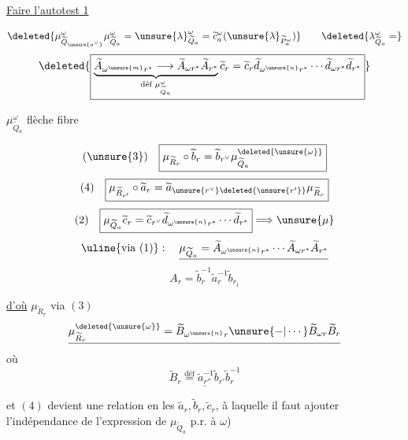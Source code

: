 \uline{Faire l'autotest 1}

\[
\deleted{\mu_{\widetilde Q_{\unsure{a^\vee}}}^{\omega}\mu_{\widetilde Q_a}^{\omega}
=\unsure{\lambda}_{\widetilde Q_a}^{\omega}
=\widetilde c_a^\omega(\unsure{\lambda}_{\widetilde P_a^\omega})}
\qquad
\deleted{\lambda_{\widetilde Q_a}^{\omega}=}
\]
\[
\deleted{\boxed{
\underbrace{\widetilde A_{\omega^{\unsure{m}}r^*}\longrightarrow
\widetilde A_{\omega r^*}\widetilde A_{r^*}}_{\text{déf }\mu_{\widetilde Q_a}^{\omega}}
\widetilde c_r=\widetilde c_r\widetilde d_{\omega^{\unsure{n}}r^*}\cdots
\widetilde d_{\omega r^*}\widetilde d_{r^*}}}
\]

$\mu_{\widetilde Q_a}^{\omega}$ flèche fibre

\[
(\unsure{3})\quad\boxed{\mu_{\widetilde R_r}\circ\widetilde b_r
=\widetilde b_{r^\vee}\mu_{\widetilde Q_a}^{\deleted{\unsure{\omega}}}}
\]
\[
(4)\quad\boxed{\mu_{\widetilde R_{r'}}\circ\widetilde a_r
=\widetilde a_{\unsure{r^\vee}\deleted{\unsure{r'}}}\mu_{\widetilde R_r}}
\]
\[
(2)\quad\boxed{\mu_{\widetilde Q_a}\widetilde c_r
=\widetilde c_{r^\vee}\widetilde d_{\omega^{\unsure{n}}r^*}\cdots\widetilde d_{r^*}}
\Longrightarrow\unsure{\mu}
\]
\[
\uline{\text{via (1)}}:\quad
\underline{\mu_{\widetilde Q_a}
=\widetilde A_{\omega^{\unsure{n}}r^*}\cdots\widetilde A_{\omega r^*}\widetilde A_{r^*}}
\]
\[
A_r=\widetilde b_r^{-1}\widetilde a_r^{-1}\widetilde b_{r_1}
\]

\uline{d'où} $\mu_{\widetilde R_r}$ via $(3)$
\[
\underline{\mu_{\widetilde R_r}^{\deleted{\unsure{\omega}}}
=\widetilde B_{\omega^{\unsure{n}}r}\unsure{-|\cdots}\widetilde B_{\omega r}\widetilde B_r}
\]
où
\[
\underline{\widetilde B_r\overset{\text{déf}}{=}\widetilde a_{r''}^{-1}\widetilde b_{r'}\widetilde b_r^{-1}}
\]

et $(4)$ devient une relation en les $\widetilde a_r,\widetilde b_r,\widetilde c_r$, à laquelle il faut ajouter l'indépendance de l'expression de $\mu_{\widetilde Q_a}$ p.r. à $\omega$)



